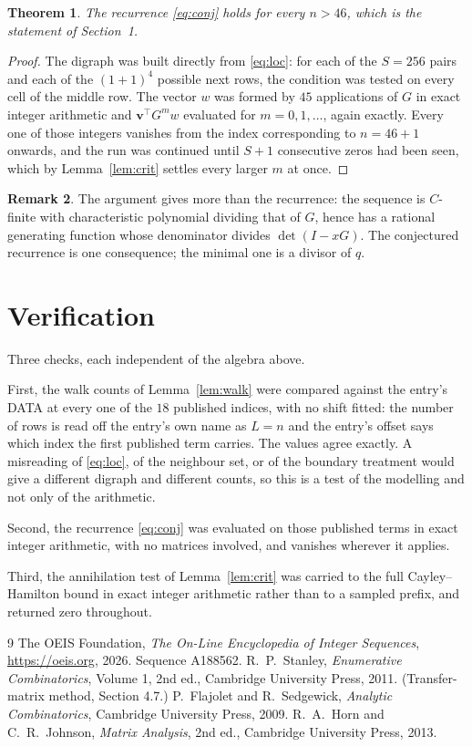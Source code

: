 \documentclass[11pt,a4paper]{article}
\theoremstyle{plain}
\newtheorem{theorem}{Theorem}
\theoremstyle{definition}
\newtheorem{remark}[theorem]{Remark}
\begin{document}
\begin{theorem}
The recurrence \eqref{eq:conj} holds for every $n>46$, which is the statement of
Section~1.
\end{theorem}

\begin{proof}
The digraph was built directly from \eqref{eq:loc}: for each of the $S=256$ pairs and each
of the $(1+1)^{4}$ possible next rows, the condition was tested on every cell of
the middle row. The vector $w$ was formed by $45$ applications of $G$ in exact integer
arithmetic and $\mathbf{v}^{\!\top}G^{m}w$ evaluated for $m=0,1,\dots$, again exactly.
Every one of those integers vanishes from the index corresponding to $n=46+1$ onwards,
and the run was continued until $S+1$ consecutive zeros had been seen, which by
Lemma~\ref{lem:crit} settles every larger $m$ at once.
\end{proof}

\begin{remark}
The argument gives more than the recurrence: the sequence is $C$-finite with characteristic
polynomial dividing that of $G$, hence has a rational generating function whose denominator
divides $\det(I-xG)$. The conjectured recurrence is one consequence; the minimal one is a
divisor of $q$.
\end{remark}

\section{Verification}

Three checks, each independent of the algebra above.

First, the walk counts of Lemma~\ref{lem:walk} were compared against the entry's DATA at
every one of the $18$ published indices, with no shift fitted: the number of rows is
read off the entry's own name as $L=n$ and the entry's offset says which index the first
published term carries. The values agree exactly. A misreading of \eqref{eq:loc}, of the
neighbour set, or of the boundary treatment would give a different digraph and different
counts, so this is a test of the modelling and not only of the arithmetic.

Second, the recurrence \eqref{eq:conj} was evaluated on those published terms in exact
integer arithmetic, with no matrices involved, and vanishes wherever it applies.

Third, the annihilation test of Lemma~\ref{lem:crit} was carried to the full
Cayley--Hamilton bound in exact integer arithmetic rather than to a sampled prefix, and
returned zero throughout.

\begin{thebibliography}{9}
 The OEIS Foundation, \emph{The On-Line Encyclopedia of Integer
Sequences}, \url{https://oeis.org}, 2026. Sequence A188562.
 R.~P.~Stanley, \emph{Enumerative Combinatorics}, Volume 1, 2nd ed.,
Cambridge University Press, 2011. (Transfer-matrix method, Section 4.7.)
 P.~Flajolet and R.~Sedgewick, \emph{Analytic Combinatorics}, Cambridge
University Press, 2009.
 R.~A.~Horn and C.~R.~Johnson, \emph{Matrix Analysis}, 2nd ed., Cambridge
University Press, 2013.
\end{thebibliography}
\end{document}
